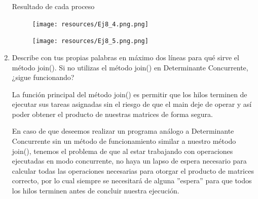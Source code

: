\begin{enumerate}
    Resultado de cada proceso 

    \begin{figure}[h]
        \centering
        \texttt{[image: resources/Ej8\_4.png.png]}
    \end{figure}

    \begin{figure}[h]
        \centering
        \texttt{[image: resources/Ej8\_5.png.png]}
    \end{figure}

    \hfill    
    
    \item Describe con tus propias palabras en máximo dos líneas para qué sirve el método join(). Si no utilizas el método join() en Determinante Concurrente, ¿sigue funcionando?

    La función principal del método join() es permitir que los hilos terminen de ejecutar sus tareas asignadas sin el riesgo de que el main deje de operar y así poder obtener el producto de nuestras matrices de forma segura.
    
    En caso de que deseemos realizar un programa análogo a Determinante Concurrente sin un método de funcionamiento similar a nuestro método join(), tenemos el problema de que al estar trabajando con operaciones ejecutadas en modo concurrente, no haya un lapso de espera necesario para calcular todas las operaciones necesarias para otorgar el producto de matrices correcto, por lo cual siempre se necesitará de alguna ''espera'' para que todos los hilos terminen antes de concluir nuestra ejecución.

    \hfill
    
\end{enumerate}
